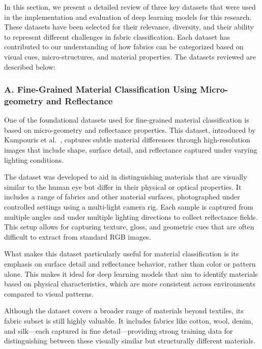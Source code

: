 In this section, we present a detailed review of three key datasets that were used in the implementation and evaluation of deep learning models for this research. These datasets have been selected for their relevance, diversity, and their ability to represent different challenges in fabric classification. Each dataset has contributed to our understanding of how fabrics can be categorized based on visual cues, micro-structures, and material properties. The datasets reviewed are described below:

\newpage

\subsubsection{A. Fine-Grained Material Classification Using Micro-geometry and Reflectance}

One of the foundational datasets used for fine-grained material classification is based on micro-geometry and reflectance properties. This dataset, introduced by Kampouris et al.~\cite{kampouris2016fine}, captures subtle material differences through high-resolution images that include shape, surface detail, and reflectance captured under varying lighting conditions.

The dataset was developed to aid in distinguishing materials that are visually similar to the human eye but differ in their physical or optical properties. It includes a range of fabrics and other material surfaces, photographed under controlled settings using a multi-light camera rig. Each sample is captured from multiple angles and under multiple lighting directions to collect reflectance fields. This setup allows for capturing texture, gloss, and geometric cues that are often difficult to extract from standard RGB images.

What makes this dataset particularly useful for material classification is its emphasis on surface detail and reflectance behavior, rather than color or pattern alone. This makes it ideal for deep learning models that aim to identify materials based on physical characteristics, which are more consistent across environments compared to visual patterns.

Although the dataset covers a broader range of materials beyond textiles, its fabric subset is still highly valuable. It includes fabrics like cotton, wool, denim, and silk—each captured in fine detail—providing strong training data for distinguishing between these visually similar but structurally different materials.

